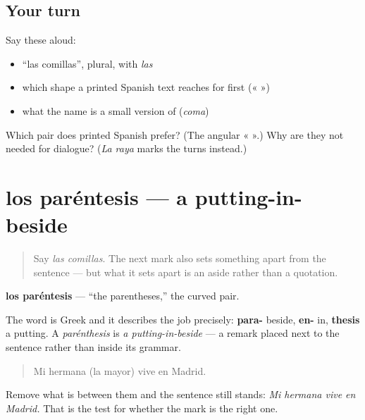 \subsection*{Your turn}
Say these aloud:

\begin{itemize}
\raggedright
  \item \textquotedblleft{}las comillas\textquotedblright{}, plural, with \emph{las}
  \item which shape a printed Spanish text reaches for first (« »)
  \item what the name is a small version of (\emph{coma})
\end{itemize}

\begin{tcolorbox}[breakable,colback=teal!4,colframe=teal!35!black,title={Before you move on}]
Which pair does printed Spanish prefer? (The angular « ».) Why are they not needed for dialogue? (\emph{La raya} marks the turns instead.)
\end{tcolorbox}
\section[los paréntesis]{los paréntesis — a putting-in-beside}

\label{lesson:ES-C424-parentesis}



\begin{quote}
Say \emph{las comillas}. The next mark also sets something apart from the sentence — but what it sets apart is an aside rather than a quotation.
\end{quote}

\begin{cousinweb}
\textbf{los paréntesis} — \textquotedblleft{}the parentheses,\textquotedblright{} the curved pair.

The word is Greek and it describes the job precisely: \textbf{para-} beside, \textbf{en-} in, \textbf{thesis} a putting. A \emph{parénthesis} is \emph{a putting-in-beside} — a remark placed next to the sentence rather than inside its grammar.

\begin{quote}
Mi hermana (la mayor) vive en Madrid.
\end{quote}

Remove what is between them and the sentence still stands: \emph{Mi hermana vive en Madrid.} That is the test for whether the mark is the right one.
\end{cousinweb}

